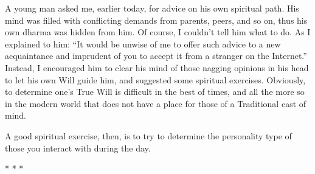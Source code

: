 A young man asked me, earlier today, for advice on his own spiritual path. His mind was filled with conflicting demands from parents, peers, and so on, thus his own dharma was hidden from him. Of course, I couldn't tell him what to do. As I explained to him: ``It would be unwise of me to offer such advice to a new acquaintance and imprudent of you to accept it from a stranger on the Internet.'' Instead, I encouraged him to clear his mind of those nagging opinions in his head to let his own Will guide him, and suggested some spiritual exercises. Obviously, to determine one's True Will is difficult in the best of times, and all the more so in the modern world that does not have a place for those of a Traditional cast of mind.

A good spiritual exercise, then, is to try to determine the personality type of those you interact with during the day.



\begin{center}* * *\end{center}

